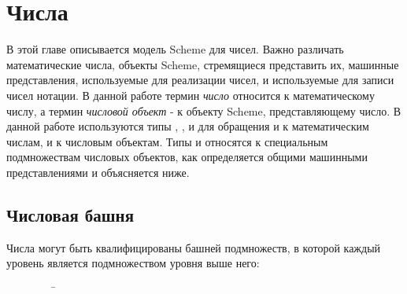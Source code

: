 \chapter{Числа}
\label{numbertypeschapter}

В этой главе описывается модель Scheme для чисел. Важно различать математические числа, объекты
Scheme, стремящиеся представить их, машинные представления, используемые для реализации чисел, и
используемые для записи чисел нотации. В данной работе термин \textit{число} относится к
математическому числу, а термин \textit{числовой объект} - к объекту Scheme, представляющему
число. В данной работе используются типы , ,  и
 для обращения и к математическим числам, и к числовым объектам. Типы
 и  относятся к специальным подмножествам числовых объектов, как
определяется общими машинными представлениями и объясняется ниже.

\section{Числовая башня}
\label{numericaltypes}

Числа могут быть квалифицированы башней подмножеств, в которой каждый уровень является
подмножеством уровня выше него:
\begin{tabbing}
\ \ \ \ \ \ \ \ \ \= \\
\>  \\
\>  \\
\>  \\
\> 
\end{tabbing}

